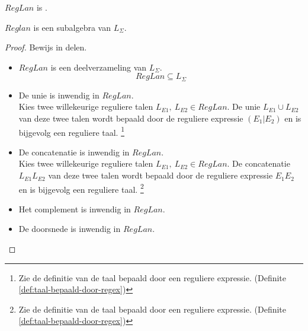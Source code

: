 \documentclass[main.tex]{subfiles}
\begin{document}
\begin{de}
  $RegLan$ is .
\end{de}

\begin{ei}
  $Reglan$ is een subalgebra van $L_{\Sigma}$.

  \begin{proof}
    Bewijs in delen.
    \begin{itemize}
    \item $RegLan$ is een deelverzameling van $L_{\Sigma}$.
      \[ RegLan \subseteq L_{\Sigma} \]
    \item De unie is inwendig in $RegLan$.\\
      Kies twee willekeurige reguliere talen $L_{E1},\ L_{E2} \in RegLan$.
      De unie $L_{E1} \cup L_{E2}$ van deze twee talen wordt bepaald door de reguliere expressie $(E_1|E_2)$ en is bijgevolg een reguliere taal.
      \footnote{Zie de definitie van de taal bepaald door een reguliere expressie. (Definite \ref{def:taal-bepaald-door-regex})}
    \item De concatenatie is inwendig in $RegLan$.\\
      Kies twee willekeurige reguliere talen $L_{E1},\ L_{E2} \in RegLan$.
      De concatenatie $L_{E1}L_{E2}$ van deze twee talen wordt bepaald door de reguliere expressie $E_1E_2$ en is bijgevolg een reguliere taal.
      \footnote{Zie de definitie van de taal bepaald door een reguliere expressie. (Definite \ref{def:taal-bepaald-door-regex})}
    \item Het complement is inwendig in $RegLan$.
    \item De doorsnede is inwendig in $RegLan$.
    \end{itemize}
  \end{proof}
\end{ei}
\end{document}

